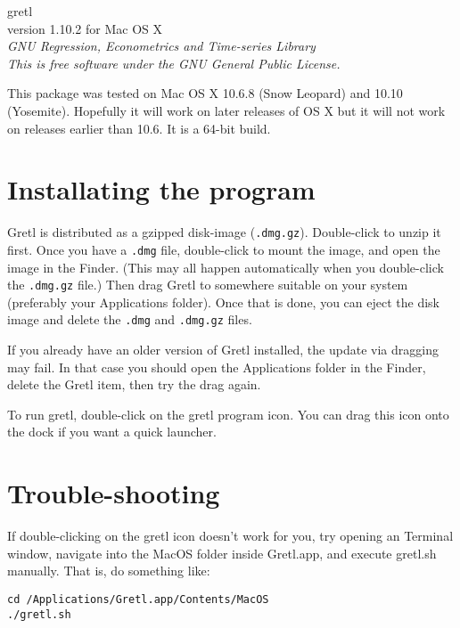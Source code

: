 \documentclass[11pt]{article}
\begin{document}
\begin{center}
{\color{gold} \titlefont gretl} \\[1ex]
version 1.10.2 for Mac OS X \\[2ex]

\textit{GNU Regression, Econometrics and Time-series Library\\
  This is free software under the GNU General Public License.}

\end{center}

This package was tested on Mac OS X 10.6.8 (Snow Leopard) and 10.10
(Yosemite).  Hopefully it will work on later releases of OS X but it
will not work on releases earlier than 10.6. It is a 64-bit build.

\section{Installating the program}
\label{sec:install}

\textsf{Gretl} is distributed as a gzipped disk-image
(\texttt{.dmg.gz}).  Double-click to unzip it first.  Once you have a
\texttt{.dmg} file, double-click to mount the image, and open the
image in the Finder. (This may all happen automatically when you
double-click the \texttt{.dmg.gz} file.) Then drag \textsf{Gretl} to
somewhere suitable on your system (preferably your
\textsf{Applications} folder).  Once that is done, you can eject the
disk image and delete the \texttt{.dmg} and \texttt{.dmg.gz} files.

If you already have an older version of \textsf{Gretl} installed, the
update via dragging may fail. In that case you should open the
\textsf{Applications} folder in the Finder, delete the \textsf{Gretl}
item, then try the drag again.

To run gretl, double-click on the gretl program icon.  You can drag
this icon onto the dock if you want a quick launcher.

\section{Trouble-shooting}

If double-clicking on the gretl icon doesn't work for you, try
opening an Terminal window, navigate into the \textsf{MacOS}
folder inside \textsf{Gretl.app}, and execute 
\textsf{gretl.sh} manually.  That is, do something like:

\begin{verbatim}
cd /Applications/Gretl.app/Contents/MacOS
./gretl.sh
\end{verbatim}
\end{document}
